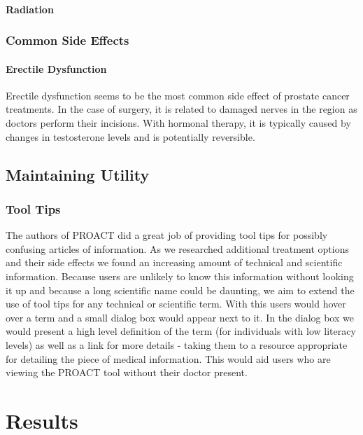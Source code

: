 \documentclass[journal]{vgtc}                %
\begin{document}
                        \paragraph{Radiation}


                \subsubsection{Common Side Effects}
                        \paragraph{Erectile Dysfunction}
                                Erectile dysfunction seems to be the most common side effect of prostate cancer treatments.
                                In the case of surgery, it is related to damaged nerves in the region as doctors perform their incisions.
                                With hormonal therapy, it is typically caused by changes in testosterone levels and is potentially reversible.


        \subsection{Maintaining Utility}
                \subsubsection{Tool Tips}
                        The authors of PROACT did a great job of providing tool tips for possibly confusing articles of information.
                        As we researched additional treatment options and their side effects we found an increasing amount of technical and scientific information.
                        Because users are unlikely to know this information without looking it up and because a long scientific name could be daunting, we aim to extend the use of tool tips for any technical or scientific term.
                        With this users would hover over a term and a small dialog box would appear next to it.
                        In the dialog box we would present a high level definition of the term (for individuals with low literacy levels) as well as a link for more details - taking them to a resource appropriate for detailing the piece of medical information.
                        This would aid users who are viewing the PROACT tool without their doctor present.


\section{Results}
\end{document}
